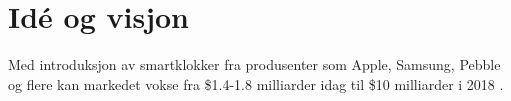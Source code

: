 \section{Idé og visjon}

Med introduksjon av smartklokker fra produsenter som Apple, Samsung, Pebble og
flere kan markedet vokse fra \${}1.4-1.8 milliarder idag til \${}10
milliarder i 2018 \cite{citi.grow}.

